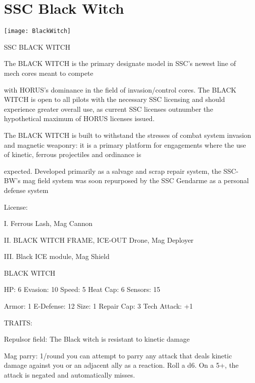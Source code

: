 \section{SSC Black Witch}

\centering\texttt{[image: BlackWitch]}


                                            SSC BLACK WITCH

The BLACK WITCH is the primary designate model in SSC’s newest line of mech cores meant to compete

with HORUS’s dominance in the field of invasion/control cores. The BLACK WITCH is open to all pilots with
the necessary SSC licensing and should experience greater overall use, as current SSC licenses outnumber
the hypothetical maximum of HORUS licenses issued.

The BLACK WITCH is built to withstand the stresses of combat system invasion and magnetic weaponry: it
is a primary platform for engagements where the use of kinetic, ferrous projectiles and ordinance is

expected. Developed primarily as a salvage and scrap repair system, the SSC-BW’s mag field system was
soon repurposed by the SSC Gendarme as a personal defense system




                                                  License:

I. Ferrous Lash, Mag Cannon

II. BLACK WITCH FRAME, ICE-OUT Drone, Mag Deployer

III. Black ICE module, Mag Shield


                                             BLACK WITCH

 HP: 6          Evasion: 10                          Speed: 5           Heat Cap: 6        Sensors: 15

 Armor: 1       E-Defense: 12                        Size: 1            Repair Cap: 3      Tech Attack:
                                                                                           +1

                                                  TRAITS:

 Repulsor field: The Black witch is resistant to kinetic damage

 Mag parry: 1/round you can attempt to parry any attack that deals kinetic damage against you or an
 adjacent ally as a reaction. Roll a d6. On a 5+, the attack is negated and automatically misses.

